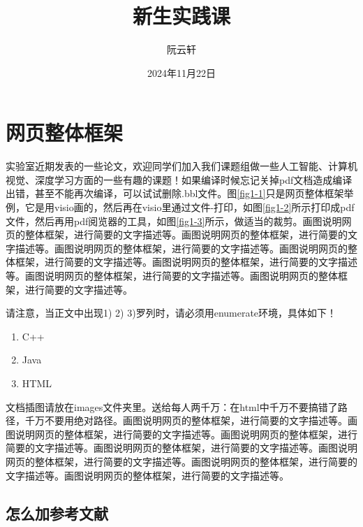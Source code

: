 \documentclass[supercite]{Experimental_Report}
\title{~~~~~~新生实践课~~~~~~}
\author{阮云轩}
\date{2024年11月22日}
\theoremstyle{definition}
\begin{document}
	
	\maketitle
	
	\clearpage
	
	
	\tableofcontents[level=2]
	
	\clearpage
	
	
	\section{网页整体框架}
	
	实验室近期发表的一些论文\cite{Li2022AAAI, Chen2021MMA, Chen2022IMC, Ren2021JVCI, Ren2022MTAP}，欢迎同学们加入我们课题组做一些人工智能、计算机视觉、深度学习方面的一些有趣的课题！如果编译时候忘记关掉pdf文档造成编译出错，甚至不能再次编译，可以试试删除.bbl文件。图\ref{fig1-1}只是网页整体框架举例，它是用visio画的，然后再在visio里通过文件-打印，如图\ref{fig1-2}所示打印成pdf文件，然后再用pdf阅览器的工具，如图\ref{fig1-3}所示，做适当的裁剪。画图说明网页的整体框架，进行简要的文字描述等。画图说明网页的整体框架，进行简要的文字描述等。画图说明网页的整体框架，进行简要的文字描述等。画图说明网页的整体框架，进行简要的文字描述等。画图说明网页的整体框架，进行简要的文字描述等。画图说明网页的整体框架，进行简要的文字描述等。画图说明网页的整体框架，进行简要的文字描述等。
	
	请注意，当正文中出现1) 2) 3)罗列时，请必须用enumerate环境，具体如下！
	
	\begin{enumerate}
		\renewcommand{\labelenumi}{\theenumi)}
		\item C++
		\item Java
		\item HTML
	\end{enumerate}
	
	文档插图请放在images文件夹里。送给每人两千万：在html中千万不要搞错了路径，千万不要用绝对路径。画图说明网页的整体框架，进行简要的文字描述等。画图说明网页的整体框架，进行简要的文字描述等。画图说明网页的整体框架，进行简要的文字描述等。画图说明网页的整体框架，进行简要的文字描述等。画图说明网页的整体框架，进行简要的文字描述等。画图说明网页的整体框架，进行简要的文字描述等。画图说明网页的整体框架，进行简要的文字描述等。
	
	\subsection{怎么加参考文献}
	
\end{document}
